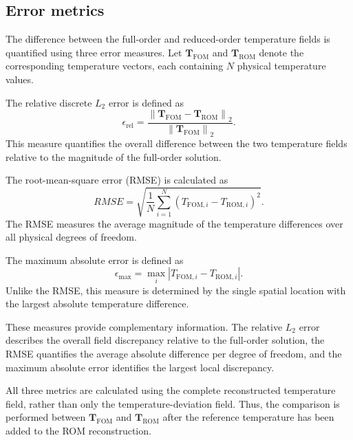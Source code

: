 \subsection{Error metrics}

The difference between the full-order and reduced-order
temperature fields is quantified using three error measures.
Let $\mathbf{T}_{\mathrm{FOM}}$ and
$\mathbf{T}_{\mathrm{ROM}}$ denote the corresponding
temperature vectors, each containing $N$ physical
temperature values.

The relative discrete $L_2$ error is defined as
\begin{equation}
    \boxed{
    \epsilon_{\mathrm{rel}}
    =
    \frac{
    \left\|
    \mathbf{T}_{\mathrm{FOM}}
    -
    \mathbf{T}_{\mathrm{ROM}}
    \right\|_2
    }{
    \left\|
    \mathbf{T}_{\mathrm{FOM}}
    \right\|_2
    }.
    }
    \label{eq:relative_l2_error}
\end{equation}
This measure quantifies the overall difference between the
two temperature fields relative to the magnitude of the
full-order solution.

The root-mean-square error (RMSE) is calculated as
\begin{equation}
    \boxed{
    RMSE
    =
    \sqrt{
    \frac{1}{N}
    \sum_{i=1}^{N}
    \left(
    T_{\mathrm{FOM},i}
    -
    T_{\mathrm{ROM},i}
    \right)^2
    }.
    }
    \label{eq:rom_rmse}
\end{equation}
The RMSE measures the average magnitude of the temperature
differences over all physical degrees of freedom.

The maximum absolute error is defined as
\begin{equation}
    \boxed{
    \epsilon_{\max}
    =
    \max_i
    \left|
    T_{\mathrm{FOM},i}
    -
    T_{\mathrm{ROM},i}
    \right|.
    }
    \label{eq:rom_max_error}
\end{equation}
Unlike the RMSE, this measure is determined by the single
spatial location with the largest absolute temperature
difference.

These measures provide complementary information. The
relative $L_2$ error describes the overall field discrepancy
relative to the full-order solution, the RMSE quantifies the
average absolute difference per degree of freedom, and the
maximum absolute error identifies the largest local
discrepancy.

All three metrics are calculated using the complete
reconstructed temperature field, rather than only the
temperature-deviation field. Thus, the comparison is performed
between $\mathbf{T}_{\mathrm{FOM}}$ and
$\mathbf{T}_{\mathrm{ROM}}$ after the reference temperature
has been added to the ROM reconstruction.

